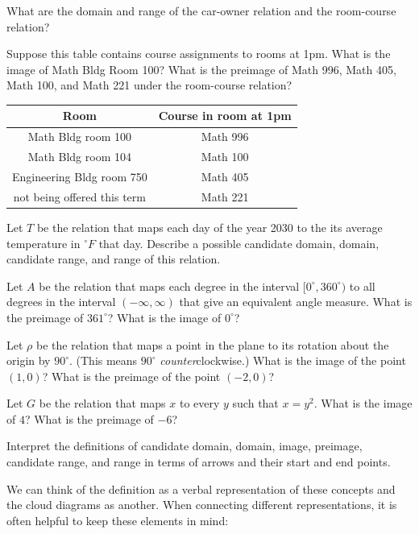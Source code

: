 \documentclass[11pt]{article}
\newenvironment{task}
	{\begin{mdframed}[linecolor=lightgray, linewidth=3pt]\raggedright}
	{\end{mdframed}}
\newcommand\degrees{^\circ}
\theoremstyle{definition}
\begin{document}
\begin{task}
What are the domain and range of the car-owner relation and the room-course relation? 

Suppose this table contains course assignments to rooms at 1pm. What is the image of Math Bldg Room 100? What is the preimage of Math 996, Math 405, Math 100, and Math 221 under the room-course relation? 

\begin{center}
\begin{tabular}{|c|c|}
\hline
Room & Course in room at 1pm \\ \hline
Math Bldg room 100 & Math 996 \\ 
Math Bldg room 104 & Math 100 \\ 
Engineering Bldg room 750 & Math 405 \\ 
not being offered this term & Math 221 \\ \hline
\end{tabular}
\end{center}

Let $T$ be the relation that maps each day of the year 2030 to the its average temperature in $\degrees F$ that day. Describe a possible candidate domain, domain, candidate range, and range of this relation.

Let $A$ be the relation that maps each degree in the interval $[0\degrees, 360\degrees)$ to all degrees in the interval $(-\infty,\infty)$ that give an equivalent angle measure. What is the preimage of $361\degrees$? What is the image of $0\degrees$? 

Let $\rho$ be the relation that maps a point in the plane to its rotation about the origin by $90\degrees$.  (This means $90\degrees$ {\it counter}clockwise.) What is the image of the point $(1,0)$? What is the preimage of the point $(-2,0)$? 

Let $G$ be the relation that maps $x$ to every $y$ such that $x=y^2$. What is the image of $4$? What is the preimage of $-6$?

\end{task}

\begin{task}
Interpret the definitions of candidate domain, domain, image, preimage, candidate range, and range in terms of arrows and their start and end points.
\end{task}

We can think of the definition as a verbal representation of these concepts and the cloud diagrams as another. When connecting different representations, it is often helpful to keep these elements in mind:
\end{document}
